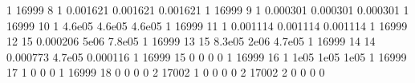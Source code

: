 \documentclass[letterpaper,10pt,english,openany,oneside]{sphinxmanual}
\begin{document}
\begin{sphinxVerbatim}[commandchars=\\\{\}]
     1 \textbar{}       16999 \textbar{}     8 \textbar{}           1 \textbar{}   0.001621 \textbar{} 0.001621 \textbar{} 0.001621 \textbar{}        \textbar{}        \textbar{}        \textbar{}
     1 \textbar{}       16999 \textbar{}     9 \textbar{}           1 \textbar{}   0.000301 \textbar{} 0.000301 \textbar{} 0.000301 \textbar{}        \textbar{}        \textbar{}        \textbar{}
     1 \textbar{}       16999 \textbar{}    10 \textbar{}           1 \textbar{}    4.6e\PYGZhy{}05 \textbar{}  4.6e\PYGZhy{}05 \textbar{}  4.6e\PYGZhy{}05 \textbar{}        \textbar{}        \textbar{}        \textbar{}
     1 \textbar{}       16999 \textbar{}    11 \textbar{}           1 \textbar{}   0.001114 \textbar{} 0.001114 \textbar{} 0.001114 \textbar{}        \textbar{}        \textbar{}        \textbar{}
     1 \textbar{}       16999 \textbar{}    12 \textbar{}          15 \textbar{}   0.000206 \textbar{}    5e\PYGZhy{}06 \textbar{}  7.8e\PYGZhy{}05 \textbar{}        \textbar{}        \textbar{}        \textbar{}
     1 \textbar{}       16999 \textbar{}    13 \textbar{}          15 \textbar{}    8.3e\PYGZhy{}05 \textbar{}    2e\PYGZhy{}06 \textbar{}  4.7e\PYGZhy{}05 \textbar{}        \textbar{}        \textbar{}        \textbar{}
     1 \textbar{}       16999 \textbar{}    14 \textbar{}          14 \textbar{}   0.000773 \textbar{}  4.7e\PYGZhy{}05 \textbar{} 0.000116 \textbar{}        \textbar{}        \textbar{}        \textbar{}
     1 \textbar{}       16999 \textbar{}    15 \textbar{}           0 \textbar{}          0 \textbar{}        0 \textbar{}        0 \textbar{}        \textbar{}        \textbar{}        \textbar{}
     1 \textbar{}       16999 \textbar{}    16 \textbar{}           1 \textbar{}      1e\PYGZhy{}05 \textbar{}    1e\PYGZhy{}05 \textbar{}    1e\PYGZhy{}05 \textbar{}        \textbar{}        \textbar{}        \textbar{}
     1 \textbar{}       16999 \textbar{}    17 \textbar{}           1 \textbar{}          0 \textbar{}        0 \textbar{}        0 \textbar{}        \textbar{}        \textbar{}        \textbar{}
     1 \textbar{}       16999 \textbar{}    18 \textbar{}           0 \textbar{}          0 \textbar{}        0 \textbar{}        0 \textbar{}        \textbar{}        \textbar{}        \textbar{}
     2 \textbar{}       17002 \textbar{}     1 \textbar{}           0 \textbar{}          0 \textbar{}        0 \textbar{}        0 \textbar{}        \textbar{}        \textbar{}        \textbar{}
     2 \textbar{}       17002 \textbar{}     2 \textbar{}           0 \textbar{}          0 \textbar{}        0 \textbar{}        0 \textbar{}        \textbar{}        \textbar{}        \textbar{}

\end{sphinxVerbatim}
\end{document}
